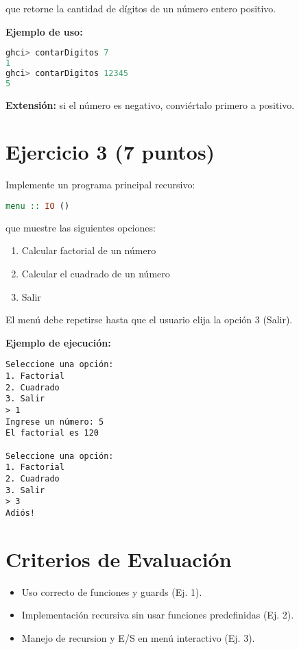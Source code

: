 \documentclass[12pt]{article}
\begin{document}
que retorne la cantidad de dígitos de un número entero positivo.

\textbf{Ejemplo de uso:}
\begin{lstlisting}[language=Haskell]
ghci> contarDigitos 7
1
ghci> contarDigitos 12345
5
\end{lstlisting}

\textbf{Extensión:} si el número es negativo, conviértalo primero a positivo.

\section*{Ejercicio 3 (7 puntos)}
Implemente un programa principal recursivo:

\begin{lstlisting}[language=Haskell]
menu :: IO ()
\end{lstlisting}

que muestre las siguientes opciones:

\begin{enumerate}
    \item Calcular factorial de un número
    \item Calcular el cuadrado de un número
    \item Salir
\end{enumerate}

El menú debe repetirse hasta que el usuario elija la opción 3 (Salir).

\textbf{Ejemplo de ejecución:}
\begin{verbatim}
Seleccione una opción:
1. Factorial
2. Cuadrado
3. Salir
> 1
Ingrese un número: 5
El factorial es 120

Seleccione una opción:
1. Factorial
2. Cuadrado
3. Salir
> 3
Adiós!
\end{verbatim}

\section*{Criterios de Evaluación}
\begin{itemize}
    \item Uso correcto de funciones y guards (Ej. 1).
    \item Implementación recursiva sin usar funciones predefinidas (Ej. 2).
    \item Manejo de recursion y E/S en menú interactivo (Ej. 3).
\end{itemize}
\end{document}
